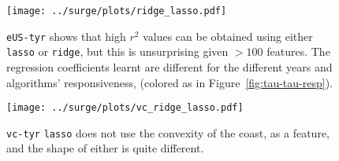 \begin{figure}[htb!]
    \centering
    \texttt{[image: ../surge/plots/ridge\_lasso.pdf]}
    \vspace{-15pt}
   \caption{\texttt{eUS-tyr} shows that high $r^2$ values can be obtained using
   either \texttt{lasso} or \texttt{ridge}, but this is unsurprising given $>100$
   features. The regression coefficients learnt are different for the different years
   and algorithms' responsiveness,
   (colored as in Figure~\ref{fig:tau-tau-resp}).}
    \label{fig:learnt-eus}

    \centering
    \texttt{[image: ../surge/plots/vc\_ridge\_lasso.pdf]}
    \caption{\texttt{vc-tyr} \texttt{lasso} does not use the convexity of the coast,
             as a feature, and the shape of either is quite different.}
    \label{fig:learnt-vc}
\end{figure}
